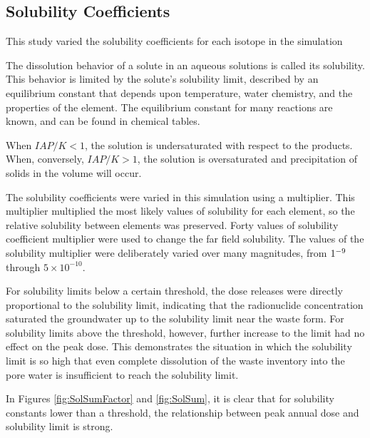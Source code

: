 
\subsection{Solubility Coefficients}

This study varied the solubility coefficients for each isotope in the simulation 

The dissolution behavior of a solute in an aqueous solutions is called its 
solubility. This behavior is limited by the solute's solubility limit, described  
by an equilibrium constant that depends upon temperature, water chemistry, and 
the properties of the element. The equilibrium constant for many reactions are known, and can be found in 
chemical tables.

When $IAP/K<1$, the solution is undersaturated with respect to the products. When, 
conversely, $IAP/K>1$, the solution is oversaturated and precipitation of solids 
in the volume will occur. 

The solubility coefficients were varied in this simulation using a multiplier. 
This multiplier multiplied the most likely values of solubility for each 
element, so the relative solubility between elements was preserved.  Forty 
values of solubility coefficient multiplier were used to change the far field 
solubility.  The values of the solubility multiplier were deliberately varied 
over many magnitudes, from $1\time10^{-9}$ through $5\times10^{-10}$. 

For solubility limits below a certain threshold, the dose releases were directly 
proportional to the solubility limit, indicating that the radionuclide 
concentration saturated the groundwater up to the solubility limit near the 
waste form.  For solubility limits above the threshold, however, further 
increase to the limit had no effect on the peak dose. This demonstrates the 
situation in which the solubility limit is so high that even complete 
dissolution of the waste inventory into the pore water is insufficient to reach 
the solubility limit.

In Figures \ref{fig:SolSumFactor} and \ref{fig:SolSum}, it is clear that for 
solubility constants lower than a threshold, the relationship between peak 
annual dose and solubility limit is strong.

